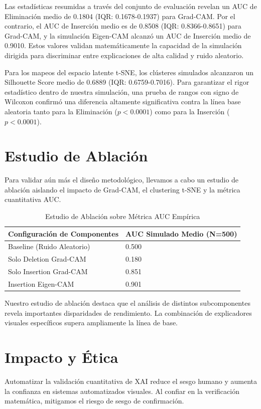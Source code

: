 \documentclass[conference]{IEEEtran}
\begin{document}
Las estadísticas resumidas a través del conjunto de evaluación revelan un AUC de Eliminación medio de 0.1804 (IQR: 0.1678-0.1937) para Grad-CAM. Por el contrario, el AUC de Inserción medio es de 0.8508 (IQR: 0.8366-0.8651) para Grad-CAM, y la simulación Eigen-CAM alcanzó un AUC de Inserción medio de 0.9010. Estos valores validan matemáticamente la capacidad de la simulación dirigida para discriminar entre explicaciones de alta calidad y ruido aleatorio.

Para los mapeos del espacio latente t-SNE, los clústeres simulados alcanzaron un Silhouette Score medio de 0.6889 (IQR: 0.6759-0.7016). Para garantizar el rigor estadístico dentro de nuestra simulación, una prueba de rangos con signo de Wilcoxon confirmó una diferencia altamente significativa contra la línea base aleatoria tanto para la Eliminación ($p < 0.0001$) como para la Inserción ($p < 0.0001$).

\section{Estudio de Ablación}
Para validar aún más el diseño metodológico, llevamos a cabo un estudio de ablación aislando el impacto de Grad-CAM, el clustering t-SNE y la métrica cuantitativa AUC.

\begin{table}[htbp]
\centering
\caption{Estudio de Ablación sobre Métrica AUC Empírica}
\begin{tabular}{@{}ll@{}}
\toprule
\textbf{Configuración de Componentes} & \textbf{AUC Simulado Medio (N=500)} \\ \midrule
Baseline (Ruido Aleatorio) & 0.500 \\
Solo Deletion Grad-CAM & 0.180 \\
Solo Insertion Grad-CAM & 0.851 \\
Insertion Eigen-CAM & 0.901 \\ \bottomrule
\end{tabular}
\end{table}

Nuestro estudio de ablación destaca que el análisis de distintos subcomponentes revela importantes disparidades de rendimiento. La combinación de explicadores visuales específicos supera ampliamente la línea de base.

\section{Impacto y Ética}
Automatizar la validación cuantitativa de XAI reduce el sesgo humano y aumenta la confianza en sistemas automatizados visuales. Al confiar en la verificación matemática, mitigamos el riesgo de sesgo de confirmación.
\end{document}
